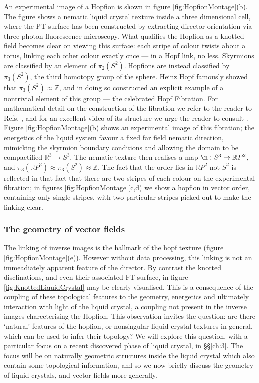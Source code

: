 An experimental image of a Hopfion is shown in figure \ref{fig:HopfionMontage}(b)\cite{Chen}. The figure shows a nematic liquid crystal texture inside a three dimensional cell, where the PT surface has been constructed by extracting director orientation via three-photon fluorescence microscopy. What qualifies the Hopfion as a knotted field becomes clear on viewing this surface: each stripe of colour twists about a torus, linking each other colour exactly once --- in a Hopf link, no less. Skyrmions are classified by an element of $\pi_2(S^2)$. Hopfions are instead classified by $\pi_3(S^2)$, the third homotopy group of the sphere. Heinz Hopf famously showed that $\pi_3(S^2) \approx \mathbb{Z}$, and in doing so constructed an explicit example of a nontrivial element of this group --- the celebrated Hopf Fibration. For mathematical detail on the construction of the fibration we refer to the reader to Refs. \cite{GarethBook BottTu}, and for an excellent video of its structure we urge the reader to consult \cite{Niles}. Figure \ref{fig:HopfionMontage}(b) shows an experimental image of this fibration; the energetics of the liquid system favour a fixed far field nematic direction, mimicking the skyrmion boundary conditions and allowing the domain to be compactified $\mathbb{R}^3\rightarrow {S}^3$. The nematic texture then realises a map $\n: S^3 \rightarrow \mathbb{R}P^2$, and $\pi_3(\mathbb{R}P^2) \approx \pi_3(S^2) \approx \mathbb{Z}$. The fact that the order lies in $\mathbb{R}P^2$ not $S^2$ is reflected in that fact that there are two stripes of each colour on the experimental fibration\cite{Chen,Ackerman}; in figures \ref{fig:HopfionMontage}(c,d) we show a hopfion in vector order, containing only single stripes, with two particular stripes picked out to make the linking clear.
\subsubsection{The geometry of vector fields}
The linking of inverse images is the hallmark of the hopf texture (figure \ref{fig:HopfionMontage}(e)). However without data processing, this linking is not an immeadiately apparent feature of the director. By contrast the knotted disclinations, and even their associated PT surface, in figure \ref{fig:KnottedLiquidCrystal} may be clearly visualised. This is a consequence of the coupling of these topological features to the geometry, energetics and ultimately interaction with light of the liquid crystal, a coupling not present in the inverse images charecterising the Hopfion. This observation invites the question: are there `natural' features of the hopfion, or nonsingular liquid crystal textures in general, which can be used to infer their topology? We will explore this question, with a particular focus on a recent discovered phase of liquid crystal, in \S\S\ref{ch:3}. The focus will be on naturally geometric structures inside the liquid crystal which also contain some topological information, and so we now briefly discuss the geometry of liquid crystals, and vector fields more generally. 

